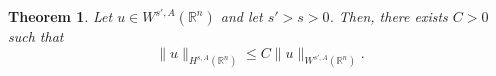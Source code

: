 \documentclass[leqno,twoside, 12pt]{amsart}
\theoremstyle{plain}
\numberwithin{equation}{section} \numberwithin{figure}{section}
\newtheorem{theorem}{Theorem}[section]
\theoremstyle{definition}
\newcommand{\R}{\mathbb R}
\numberwithin{equation}{section}
\begin{document}
\begin{theorem} \label{teo.s2}
Let $u\in W^{s',A}(\R^n)$ and let $s'>s>0$. Then, there exists $C>0$ such that
$$
\|u\|_{H^{s,A}(\R^n)} \leq C \|u\|_{W^{s',A}(\R^n)}.
$$
\end{theorem}

%
%
%
%
%
\end{document}
